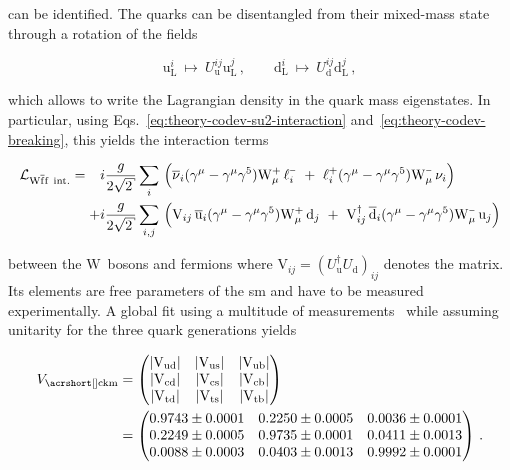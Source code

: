 can be identified. The quarks can be disentangled from their mixed-mass state through a rotation of the fields 

\begin{equation}
\mathrm{u}^{i}_\mathrm{L}~\mapsto~ U^{ij}_\mathrm{u}\mathrm{u}^{j}_\mathrm{L}\,,\qquad \mathrm{d}^{i}_\mathrm{L}~\mapsto~ U^{ij}_\mathrm{d}\mathrm{d}^{j}_\mathrm{L}\,,
\end{equation}

which allows to write the Lagrangian density in the quark mass eigenstates. In particular, using Eqs.~\ref{eq:theory-codev-su2-interaction} and~\ref{eq:theory-codev-breaking}, this yields the interaction terms

\begin{align}
\mathcal{L}_{\mathrm{W}\bar{\mathrm{f}}\mathrm{f}~\mathrm{int.}}=\hphantom{+}i&\frac{g}{2\sqrt{2}}\sum_{i}\,\Big(\bar{\nu}_{i}(\gamma^\mu-\gamma^\mu\gamma^5) \mathrm{W}^{\rmplus}_\mu\,\ell^{\rmminus}_{i}~+~{\ell}^{\rmplus}_{i}(\gamma^\mu-\gamma^\mu\gamma^5) \mathrm{W}^{\rmminus}_\mu\,\nu_{i}\Big)\nonumber\\
+i&\frac{g}{2\sqrt{2}}\sum_{i,j}\,\Big(\mathrm{V}_{ij}\,\bar{\mathrm{u}}_{i}(\gamma^\mu-\gamma^\mu\gamma^5) \mathrm{W}^{\rmplus}_\mu\,\mathrm{d}_{j}~+~\mathrm{V}_{ij}^\dagger\,\bar{\mathrm{d}}_{i}(\gamma^\mu-\gamma^\mu\gamma^5) \mathrm{W}^{\rmminus}_\mu\,\mathrm{u}_{j}\Big) \label{eq:theory-qqW-int}
\end{align}

between the $\mathrm{W}$~bosons and fermions where $\mathrm{V}_{ij}=(U^\dagger_\mathrm{u}U_\mathrm{d})_{ij}$ denotes the  matrix. Its elements are free parameters of the \gls{sm} and have to be measured experimentally. A global fit using a multitude of measurements~\cite{Olive:2016xmw} while assuming unitarity for the three quark generations yields

\begin{align}
V_\mathrm{\gls{ckm}}&=\begin{pmatrix}
|\ckm{ud}| & |\ckm{us}| & |\ckm{ub}| \\
|\ckm{cd}| & |\ckm{cs}| & |\ckm{cb}| \\
|\ckm{td}| & |\ckm{ts}| & |\ckm{tb}| 
\end{pmatrix}\nonumber
\\&=
\begin{pmatrix}
0.9743\pm0.0001 & 0.2250\pm0.0005 & 0.0036\pm0.0001 \\
0.2249\pm0.0005 & 0.9735\pm0.0001 & 0.0411\pm0.0013 \\
0.0088\pm0.0003 & 0.0403\pm0.0013 & 0.9992\pm0.0001 
\end{pmatrix}\,.
\end{align}


